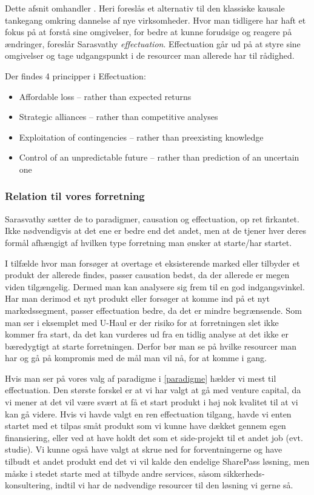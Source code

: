 
Dette afsnit omhandler \citet{sarasvathy2001effectuation}.
Heri foreslås et alternativ til den klassiske kausale tankegang omkring dannelse af nye virksomheder.
Hvor man tidligere har haft et fokus på at forstå sine omgivelser, for bedre at kunne forudsige og reagere på ændringer, foreslår Sarasvathy \textit{effectuation}.
Effectuation går ud på at styre sine omgivelser og tage udgangspunkt i de resourcer man allerede har til rådighed.

Der findes 4 principper i Effectuation:
\begin{itemize}
  \item Affordable loss -- rather than expected returns
  \item Strategic alliances -- rather than competitive analyses
  \item Exploitation of contingencies -- rather than preexisting knowledge
  \item Control of an unpredictable future -- rather than prediction of an uncertain one
\end{itemize}

\subsubsection{Relation til vores forretning}
Sarasvathy sætter de to paradigmer, causation og effectuation, op ret firkantet.
Ikke nødvendigvis at det ene er bedre end det andet, men at de tjener hver deres formål afhængigt af hvilken type forretning man ønsker at starte/har startet.

I tilfælde hvor man forsøger at overtage et eksisterende marked eller tilbyder et produkt der allerede findes, passer causation bedst, da der allerede er megen viden tilgængelig.
Dermed man kan analysere sig frem til en god indgangsvinkel.
Har man derimod et nyt produkt eller forsøger at komme ind på et nyt markedssegment, passer effectuation bedre, da det er mindre begrænsende.
Som man ser i eksemplet med U-Haul er der risiko for at forretningen slet ikke kommer fra start, da det kan vurderes ud fra en tidlig analyse at det ikke er bæredygtigt at starte forretningen.
Derfor bør man se på hvilke resourcer man har og gå på kompromis med de mål man vil nå, for at komme i gang.

Hvis man ser på vores valg af paradigme i \cref{paradigme} hælder vi mest til effectuation.
Den største forskel er at vi har valgt at gå med venture capital, da vi mener at det vil være svært at få et start produkt i høj nok kvalitet til at vi kan gå videre.
Hvis vi havde valgt en ren effectuation tilgang, havde vi enten startet med et tilpas småt produkt som vi kunne have dækket gennem egen finansiering, eller ved at have holdt det som et side-projekt til et andet job (evt. studie).
Vi kunne også have valgt at skrue ned for forventningerne og have tilbudt et andet produkt end det vi vil kalde den endelige SharePass løsning, men måske i stedet starte med at tilbyde andre services, såsom sikkerheds-konsultering, indtil vi har de nødvendige resourcer til den løsning vi gerne så.
